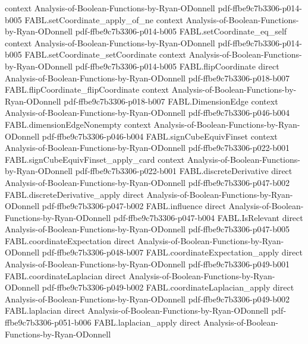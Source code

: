 \begin{theorem}
  {context}
  {Analysis-of-Boolean-Functions-by-Ryan-ODonnell}
  {pdf-ffbe9c7b3306-p014-b005}
\proofstep
  {FABL.setCoordinate_apply_of_ne}
  {context}
  {Analysis-of-Boolean-Functions-by-Ryan-ODonnell}
  {pdf-ffbe9c7b3306-p014-b005}
\proofstep
  {FABL.setCoordinate_eq_self}
  {context}
  {Analysis-of-Boolean-Functions-by-Ryan-ODonnell}
  {pdf-ffbe9c7b3306-p014-b005}
\proofstep
  {FABL.setCoordinate_setCoordinate}
  {context}
  {Analysis-of-Boolean-Functions-by-Ryan-ODonnell}
  {pdf-ffbe9c7b3306-p014-b005}
\proofstep
  {FABL.flipCoordinate}
  {direct}
  {Analysis-of-Boolean-Functions-by-Ryan-ODonnell}
  {pdf-ffbe9c7b3306-p018-b007}
\proofstep
  {FABL.flipCoordinate_flipCoordinate}
  {context}
  {Analysis-of-Boolean-Functions-by-Ryan-ODonnell}
  {pdf-ffbe9c7b3306-p018-b007}
\proofstep
  {FABL.DimensionEdge}
  {context}
  {Analysis-of-Boolean-Functions-by-Ryan-ODonnell}
  {pdf-ffbe9c7b3306-p046-b004}
\proofstep
  {FABL.dimensionEdgeNonempty}
  {context}
  {Analysis-of-Boolean-Functions-by-Ryan-ODonnell}
  {pdf-ffbe9c7b3306-p046-b004}
\proofstep
  {FABL.signCubeEquivFinset}
  {context}
  {Analysis-of-Boolean-Functions-by-Ryan-ODonnell}
  {pdf-ffbe9c7b3306-p022-b001}
\proofstep
  {FABL.signCubeEquivFinset_apply_card}
  {context}
  {Analysis-of-Boolean-Functions-by-Ryan-ODonnell}
  {pdf-ffbe9c7b3306-p022-b001}
\proofstep
  {FABL.discreteDerivative}
  {direct}
  {Analysis-of-Boolean-Functions-by-Ryan-ODonnell}
  {pdf-ffbe9c7b3306-p047-b002}
\proofstep
  {FABL.discreteDerivative_apply}
  {direct}
  {Analysis-of-Boolean-Functions-by-Ryan-ODonnell}
  {pdf-ffbe9c7b3306-p047-b002}
\proofstep
  {FABL.influence}
  {direct}
  {Analysis-of-Boolean-Functions-by-Ryan-ODonnell}
  {pdf-ffbe9c7b3306-p047-b004}
\proofstep
  {FABL.IsRelevant}
  {direct}
  {Analysis-of-Boolean-Functions-by-Ryan-ODonnell}
  {pdf-ffbe9c7b3306-p047-b005}
\proofstep
  {FABL.coordinateExpectation}
  {direct}
  {Analysis-of-Boolean-Functions-by-Ryan-ODonnell}
  {pdf-ffbe9c7b3306-p048-b007}
\proofstep
  {FABL.coordinateExpectation_apply}
  {direct}
  {Analysis-of-Boolean-Functions-by-Ryan-ODonnell}
  {pdf-ffbe9c7b3306-p049-b001}
\proofstep
  {FABL.coordinateLaplacian}
  {direct}
  {Analysis-of-Boolean-Functions-by-Ryan-ODonnell}
  {pdf-ffbe9c7b3306-p049-b002}
\proofstep
  {FABL.coordinateLaplacian_apply}
  {direct}
  {Analysis-of-Boolean-Functions-by-Ryan-ODonnell}
  {pdf-ffbe9c7b3306-p049-b002}
\proofstep
  {FABL.laplacian}
  {direct}
  {Analysis-of-Boolean-Functions-by-Ryan-ODonnell}
  {pdf-ffbe9c7b3306-p051-b006}
\proofstep
  {FABL.laplacian_apply}
  {direct}
  {Analysis-of-Boolean-Functions-by-Ryan-ODonnell}

\end{theorem}
